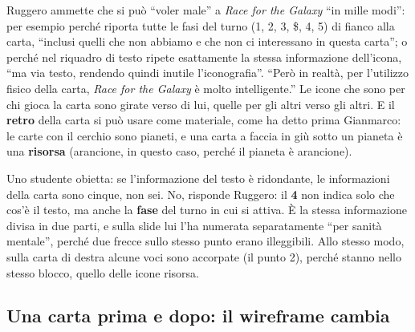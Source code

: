Ruggero ammette che si può ``voler male'' a \emph{Race for the Galaxy} ``in mille
modi'': per esempio perché riporta tutte le fasi del turno (1, 2, 3, \$, 4, 5) di fianco
alla carta, ``inclusi quelli che non abbiamo e che non ci interessano in questa
carta''; o perché nel riquadro di testo ripete esattamente la stessa informazione
dell'icona, ``ma via testo, rendendo quindi inutile l'iconografia''. ``Però in realtà,
per l'utilizzo fisico della carta, \emph{Race for the Galaxy} è molto intelligente.''
Le icone che sono per chi gioca la carta sono girate verso di lui, quelle per gli altri
verso gli altri. E il \textbf{retro} della carta si può usare come materiale, come ha
detto prima Gianmarco: le carte con il cerchio sono pianeti, e una carta a faccia in
giù sotto un pianeta è una \textbf{risorsa} (arancione, in questo caso, perché il pianeta
è arancione).

Uno studente obietta: se l'informazione del testo è ridondante, le informazioni della
carta sono cinque, non sei. No, risponde Ruggero: il \textbf{4} non indica solo che
cos'è il testo, ma anche la \textbf{fase} del turno in cui si attiva. È la stessa
informazione divisa in due parti, e sulla slide lui l'ha numerata separatamente
``per sanità mentale'', perché due frecce sullo stesso punto erano illeggibili. Allo
stesso modo, sulla carta di destra alcune voci sono accorpate (il punto 2), perché
stanno nello stesso blocco, quello delle icone risorsa.

\subsection{Una carta prima e dopo: il wireframe cambia}
\label{a10:sec:wireframe}



